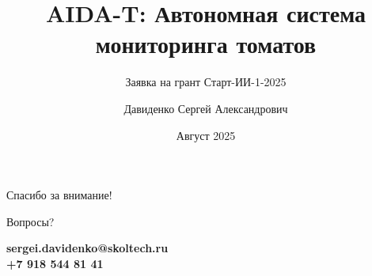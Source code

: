 \documentclass[aspectratio=169,8pt]{beamer}
\title{AIDA-T: Автономная система мониторинга томатов}
\subtitle{Заявка на грант Старт-ИИ-1-2025}
\author{Давиденко Сергей Александрович}
\institute{Сколковский институт науки и технологий}
\date{Август 2025}
\begin{document}


  









\begin{frame}
\centering
\vspace{2cm}
{\Huge \textcolor{aiblue}{Спасибо за внимание!}}
\vspace{1cm}

{\Large Вопросы?}
\vspace{1cm}

\textcolor{aigreen}{\textbf{sergei.davidenko@skoltech.ru}}\\
\textcolor{aigreen}{\textbf{+7 918 544 81 41}}
\end{frame}
\end{document}
